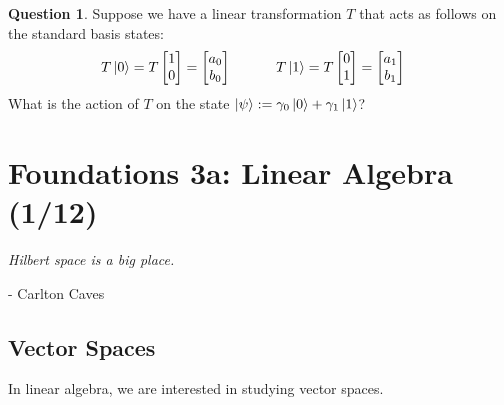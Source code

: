 \documentclass[letterpaper, 12pt]{article}
\newcommand{\1}{\mathds{1}}	%
\theoremstyle{definition}
\newtheorem{definition}[theorem]{Definition}
\newtheorem{question}{Question}
\begin{document}
\begin{question}
    Suppose we have a linear transformation $T$ that acts as follows on the standard basis states: 
    \begin{align}
        T\ket{0} = T\begin{bmatrix}
            1 \\ 0
        \end{bmatrix} = \begin{bmatrix}
            a_0 \\ b_0
        \end{bmatrix} &\;\;\;\;\;\;\;\;\;\;\;\; T\ket{1} = T\begin{bmatrix}
            0 \\ 1
        \end{bmatrix} = \begin{bmatrix}
            a_1 \\ b_1
        \end{bmatrix}
    \end{align}
    What is the action of $T$ on the state $\ket{\psi} := \gamma_0\ket{0} + \gamma_1 \ket{1}$?
\end{question}
\newpage 



\section[Foundations 3a -- {\it Linear Algebra}]{Foundations 3a: Linear Algebra (1/12)}

\textit{Hilbert space is a big place.}

{\small{- Carlton Caves}}

\subsection{Vector Spaces}

In linear algebra, we are interested in studying vector spaces.
\end{document}
